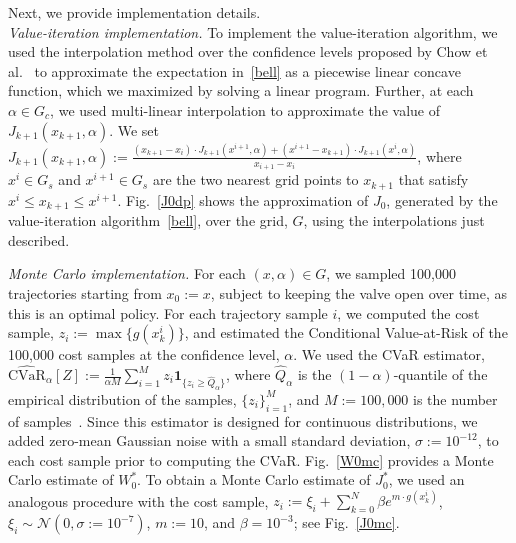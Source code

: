 \documentclass[letterpaper, 10 pt, conference]{ieeeconf}  %
\begin{document}
Next, we provide implementation details.\\
\textit{Value-iteration implementation.}
To implement the value-iteration algorithm, we used the interpolation method over the confidence levels proposed by Chow et al.~\cite{chow2015risk} 
to approximate the expectation in~\eqref{bell} as a piecewise linear concave function, which we maximized by solving a linear program.
Further, at each $\alpha \in G_c$, we used multi-linear interpolation to approximate the value of $J_{k+1}(x_{k+1}, \alpha)$.
We set $J_{k+1}(x_{k+1}, \alpha) := \frac{(x_{k+1} - x_i) \cdot J_{k+1}(x^{i+1}, \alpha) + (x^{i+1} - x_{k+1})  \cdot J_{k+1}(x^i, \alpha)}{x_{i+1}-x_i}$,
where $x^i \in G_s$ and $x^{i+1} \in G_s$ are the two nearest grid points to $x_{k+1}$ that satisfy $x^i \leq x_{k+1} \leq x^{i+1}$.
Fig.~\ref{J0dp} shows the approximation of $J_0$, generated by the value-iteration algorithm~\eqref{bell}, over the grid, $G$,
using the interpolations just described.

\textit{Monte Carlo implementation.}
For each $(x,\alpha) \in G$, we sampled 100,000 trajectories starting from $x_0 := x$, subject to keeping the valve open over time,
as this is an optimal policy.
For each trajectory sample $i$, we computed the cost sample, $z_i := \max\{g(x_k^i)\}$, and estimated the Conditional Value-at-Risk
of the 100,000 cost samples at the confidence level, $\alpha$. 
We used the CVaR estimator, $\widehat{\text{CVaR}}_\alpha[Z] := \frac{1}{\alpha M}\sum_{i=1}^M z_i \textbf{1}_{\{z_i\geq \hat{Q}_\alpha\}}$,
where $\hat{Q}_\alpha$ is the $(1-\alpha)$-quantile of the empirical distribution of the samples, $\{z_i\}_{i=1}^M$,
and $M := 100,000$ is the number of samples~\cite[Sec. 6.5.1]{shapiro2009lectures}.
Since this estimator is designed for continuous distributions, %
we added zero-mean Gaussian noise with a small standard deviation, $\sigma := 10^{-12}$, to each cost sample prior to computing the CVaR.
Fig.~\ref{W0mc} provides a Monte Carlo estimate of $W_0^*$.
To obtain a Monte Carlo estimate of $J_0^*$, we used an analogous procedure with the cost sample, 
$z_i := \xi_i + \sum_{k=0}^N \beta e^{m\cdot g(x_k^i)}$, $\xi_i \sim \mathcal{N}(0, \sigma := 10^{-7})$,
$m := 10$, and $\beta = 10^{-3}$; see Fig.~\ref{J0mc}.
%
%
\end{document}
